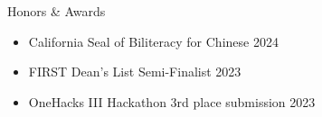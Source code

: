\documentclass[
	11pt, %
]{tex/resume} %
\begin{document}

\begin{rSection}{Honors \& Awards}

    \begin{itemize}
        \setlength\itemsep{-0.7em} %
        \item California Seal of Biliteracy for Chinese \hfill 2024
        \item FIRST Dean's List Semi-Finalist \hfill 2023
        \item OneHacks III Hackathon 3rd place submission \hfill 2023


    \end{itemize}

\end{rSection}





\end{document}
